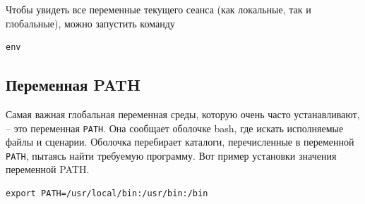 \documentclass[12pt]{article}
\begin{document}
Чтобы увидеть все переменные текущего сеанса (как локальные, так и
глобальные), можно запустить команду

\begin{verbatim}
env
\end{verbatim}







\hypertarget{PATH-variable}{%
\subsection{\texorpdfstring{\protect\hyperlink{PATH-variable}{}Переменная
PATH}{Переменная PATH}}\label{PATH-variable}}

Самая важная глобальная переменная среды, которую очень часто
устанавливают, -- это переменная \texttt{PATH}. Она сообщает оболочке
bash, где искать исполняемые файлы и сценарии. Оболочка перебирает
каталоги, перечисленные в переменной \texttt{PATH}, пытаясь найти
требуемую программу. Вот пример установки значения переменной PATH.

\begin{verbatim}
export PATH=/usr/local/bin:/usr/bin:/bin
\end{verbatim}
\end{document}
